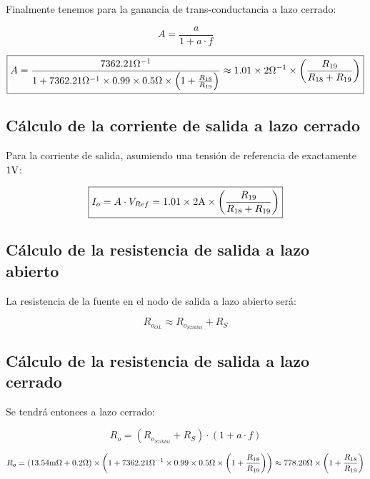 Finalmente tenemos para la ganancia de trans-conductancia a lazo cerrado:

\begin{equation}
A = \frac{a}{1 + a \cdot f}
\end{equation}

\begin{equation*}
\boxed { A = \frac{ 7362.21 \si{\per\ohm}}{1 +  7362.21 \si{\per\ohm} \times 0.99 \times 0.5 \si[per-mode=symbol]{\ohm} \times \left(  1 + \frac{R_{18}}{R_{19}} \right)} \approx 1.01 \times 2 \si{\per\ohm} \times \left( \frac{R_{19}}{R_{18} + R_{19}} \right) }
\end{equation*}

\subsection{Cálculo de la corriente de salida a lazo cerrado}


Para la corriente de salida, asumiendo una tensión de referencia de exactamente $1 \si[per-mode=symbol]{\volt}$:


\begin{equation}
\boxed { I_{o} = A \cdot V_{Ref} = 1.01 \times 2 \si[per-mode=symbol]{\ampere} \times \left( \frac{R_{19}}{R_{18} + R_{19}} \right) }
\end{equation}


\subsection{Cálculo de la resistencia de salida a lazo abierto}


La resistencia de la fuente en el nodo de salida a lazo abierto será:

\begin{equation}
R_{o_{OL}} \approx R_{o_{Sziklai}} + R_{S}
\end{equation}


\subsection{Cálculo de la resistencia de salida a lazo cerrado}


Se tendrá entonces a lazo cerrado:

\begin{equation}
R_{o} =  \left( R_{o_{Sziklai}} + R_{S} \right) \cdot \left( 1 + a \cdot f \right)
\end{equation}

\begin{equation*}
R_{o} =  \left( 13.54 \si[per-mode=symbol]{\milli\ohm} + 0.2 \si[per-mode=symbol]{\ohm} \right) \times \left( 1 + 7362.21 \si{\per\ohm} \times 0.99 \times 0.5 \si[per-mode=symbol]{\ohm} \times \left(  1 + \frac{R_{18}}{R_{19}} \right) \right) \approx 778.20 \si[per-mode=symbol]{\ohm} \times \left(  1 + \frac{R_{18}}{R_{19}} \right)
\end{equation*}

